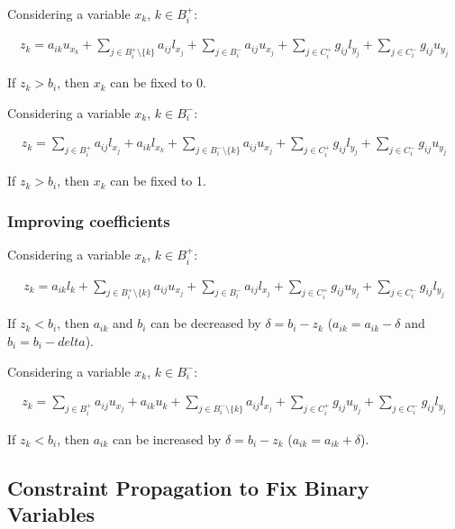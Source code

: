 \documentclass[preprint,12pt]{elsarticle}
\begin{document}
Considering a variable $x_k$, $k \in B_i^{+}$:

\begin{align}
	z_k = a_{ik}u_{x_k} + \sum_{j \in B_i^+\setminus\{k\}}{a_{ij}l_{x_j}} + \sum_{j \in B_i^-}{a_{ij}u_{x_j}} + \sum_{j \in C_i^+}{g_{ij}l_{y_j}} + \sum_{j \in C_i^-}{g_{ij}u_{y_j}}
\end{align}

If $z_k > b_i$, then $x_k$ can be fixed to 0.

Considering a variable $x_k$, $k \in B_i^{-}$:

\begin{align}
	z_k = \sum_{j \in B_i^+}{a_{ij}l_{x_j}} + a_{ik}l_{x_k} + \sum_{j \in B_i^-\setminus\{k\}}{a_{ij}u_{x_j}} + \sum_{j \in C_i^+}{g_{ij}l_{y_j}} + \sum_{j \in C_i^-}{g_{ij}u_{y_j}}
\end{align}

If $z_k > b_i$, then $x_k$ can be fixed to 1.

\subsubsection{Improving coefficients}

Considering a variable $x_k$, $k \in B_i^{+}$:

\begin{align}
	z_k = a_{ik}l_k + \sum_{j \in B_i^+\setminus\{k\}}{a_{ij}u_{x_j}} + \sum_{j \in B_i^-}{a_{ij}l_{x_j}} + \sum_{j \in C_i^+}{g_{ij}u_{y_j}} + \sum_{j \in C_i^-}{g_{ij}l_{y_j}}
\end{align}

If $z_k < b_i$, then $a_{ik}$ and $b_i$ can be decreased by $\delta = b_i - z_k$ ($a_{ik} = a_{ik} - \delta$ and $b_i = b_i - delta$).

Considering a variable $x_k$, $k \in B_i^{-}$:

\begin{align}
	z_k = \sum_{j \in B_i^+}{a_{ij}u_{x_j}} + a_{ik}u_k + \sum_{j \in B_i^-\setminus\{k\}}{a_{ij}l_{x_j}} + \sum_{j \in C_i^+}{g_{ij}u_{y_j}} + \sum_{j \in C_i^-}{g_{ij}l_{y_j}}
\end{align}

If $z_k < b_i$, then $a_{ik}$ can be increased by $\delta = b_i - z_k$ ($a_{ik} = a_{ik} + \delta$).

\subsection{Constraint Propagation to Fix Binary Variables}
\end{document}
